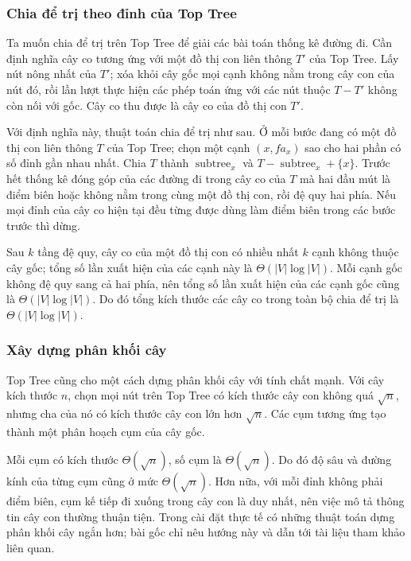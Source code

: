 \documentclass[11pt]{article}
\begin{document}
\subsubsection{Chia để trị theo đỉnh của Top Tree}

Ta muốn chia để trị trên Top Tree để giải các bài toán thống kê đường đi. Cần
định nghĩa cây co tương ứng với một đồ thị con liên thông \(T'\) của Top Tree.
Lấy nút nông nhất của \(T'\); xóa khỏi cây gốc mọi cạnh không nằm trong cây con
của nút đó, rồi lần lượt thực hiện các phép toán ứng với các nút thuộc
\(T-T'\) không còn nối với gốc. Cây co thu được là cây co của đồ thị con
\(T'\).

Với định nghĩa này, thuật toán chia để trị như sau. Ở mỗi bước đang có một đồ
thị con liên thông \(T\) của Top Tree; chọn một cạnh \((x,fa_x)\) sao cho hai
phần có số đỉnh gần nhau nhất. Chia \(T\) thành \(\operatorname{subtree}_x\)
và \(T-\operatorname{subtree}_x+\{x\}\). Trước hết thống kê đóng góp của các
đường đi trong cây co của \(T\) mà hai đầu mút là điểm biên hoặc không nằm
trong cùng một đồ thị con, rồi đệ quy hai phía. Nếu mọi đỉnh của cây co hiện
tại đều từng được dùng làm điểm biên trong các bước trước thì dừng.

Sau \(k\) tầng đệ quy, cây co của một đồ thị con có nhiều nhất \(k\) cạnh không
thuộc cây gốc; tổng số lần xuất hiện của các cạnh này là
\(\Theta(|V|\log |V|)\). Mỗi cạnh gốc không đệ quy sang cả hai phía, nên tổng
số lần xuất hiện của các cạnh gốc cũng là \(\Theta(|V|\log |V|)\). Do đó tổng
kích thước các cây co trong toàn bộ chia để trị là \(\Theta(|V|\log |V|)\).

\subsubsection{Xây dựng phân khối cây}

Top Tree cũng cho một cách dựng phân khối cây với tính chất mạnh. Với cây kích
thước \(n\), chọn mọi nút trên Top Tree có kích thước cây con không quá
\(\sqrt n\), nhưng cha của nó có kích thước cây con lớn hơn \(\sqrt n\). Các
cụm tương ứng tạo thành một phân hoạch cụm của cây gốc.

Mỗi cụm có kích thước \(\Theta(\sqrt n)\), số cụm là \(\Theta(\sqrt n)\). Do
đó độ sâu và đường kính của từng cụm cũng ở mức \(\Theta(\sqrt n)\). Hơn nữa,
với mỗi đỉnh không phải điểm biên, cụm kế tiếp đi xuống trong cây con là duy
nhất, nên việc mô tả thông tin cây con thường thuận tiện. Trong cài đặt thực
tế có những thuật toán dựng phân khối cây ngắn hơn; bài gốc chỉ nêu hướng này
và dẫn tới tài liệu tham khảo liên quan.
\end{document}
